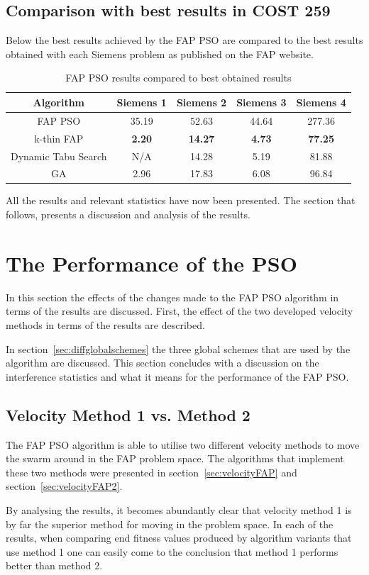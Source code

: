 \subsection{Comparison with best results in COST 259}
Below the best results achieved by the FAP PSO are compared to the best results obtained with each Siemens problem as published on the FAP website\cite{FAPWeb}.
\begin{table}[H]
\centering
\begin{tabular}{ccccc}
	\toprule
	Algorithm & Siemens 1 & Siemens 2 & Siemens 3 & Siemens 4 \\
    \midrule
	FAP PSO & 35.19 & 52.63 & 44.64 & 277.36 \\ 
	k-thin FAP & \textbf{2.20} & \textbf{14.27} & \textbf{4.73} & \textbf{77.25} \\ 
    Dynamic Tabu Search & \scriptsize{N/A} & 14.28 & 5.19 & 81.88 \\
	GA & 2.96 & 17.83 & 6.08 & 96.84 \\
    \bottomrule
	\end{tabular}
\caption{FAP PSO results compared to best obtained results}
\label{tab:allbest}
\end{table}

All the results and relevant statistics have now been presented. The section that follows, presents a discussion and analysis of the results.
\section{The Performance of the PSO}
In this section the effects of the changes made to the FAP PSO algorithm in terms of the results are discussed. First, the effect of the two developed velocity methods in terms of the results are described. 

In section~\ref{sec:diffglobalschemes} the three global schemes that are used by the algorithm are discussed. This section concludes with a discussion on the interference statistics and what it means for the performance of the FAP PSO.
\subsection{Velocity Method 1 vs. Method 2}
The FAP PSO algorithm is able to utilise two different velocity methods to move the swarm around in the FAP problem space. The algorithms that implement these two methods were presented in section~\ref{sec:velocityFAP} and section~\ref{sec:velocityFAP2}.

By analysing the results, it becomes abundantly clear that velocity method 1 is by far the superior method for moving in the problem space. In each of the results, when comparing end fitness values produced by algorithm variants that use method 1 one can easily come to the conclusion that method 1 performs better than method 2.

